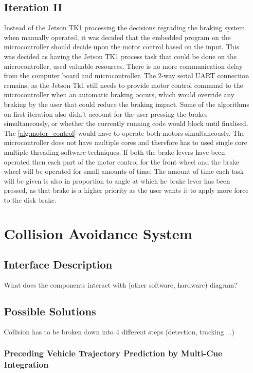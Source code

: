 \documentclass[a4paper]{report}
\begin{document}
{\subsection{Iteration II}
Instead of the Jetson TK1 processing the decisions regrading the braking system when manually operated, it was decided that the embedded program on the microcontroller should decide upon the motor control based on the input. This was decided as having the Jetson TK1 process task that could be done on the microcontroller, used valuable resources. There is no more communication delay from the computer board and microcontroller. The 2-way serial UART connection remains, as the Jetson Tk1 still needs to provide motor control command to the microcontroller when an automatic braking occurs, which would override any braking by the user that could reduce the braking impact. Some of the algorithms on first iteration also didn't account for the user pressing the brakes simultaneously, or whether the currently running code would block until finalised. The \ref{alg:motor_control} would have to operate both motors simultaneously. The microcontroller does not have multiple cores and therefore has to used single core multiple threading software techniques. If both the brake levers have been operated then each part of the motor control for the front wheel and the brake wheel will be operated for small amounts of time. The amount of time each task will be given is also in proportion to angle at which he brake lever has been pressed, as that brake is a higher priority as the user wants it to apply more force to the disk brake.

\section{Collision Avoidance System}

\subsection{Interface Description} What does the components interact with (other software, hardware) diagram?

\subsection{Possible Solutions} Collision has to be broken down into 4 different steps (detection, tracking ...)

\subsubsection{Preceding Vehicle Trajectory Prediction by Multi-Cue Integration \citep{multi-cue}}

}
\end{document}

